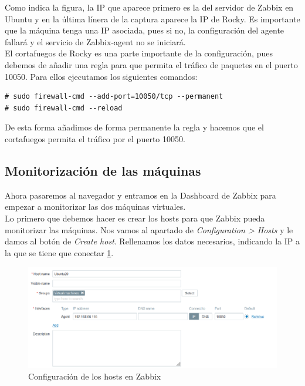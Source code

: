 Como indica la figura, la IP que aparece primero es la del servidor de Zabbix en Ubuntu y en la última línera de la captura aparece la IP de Rocky. Es importante que la máquina tenga una IP asociada, pues si no, la configuración del agente fallará y el servicio de Zabbix-agent no se iniciará.\\

El cortafuegos de Rocky es una parte importante de la configuración, pues debemos de añadir una regla para que permita el tráfico de paquetes en el puerto 10050. Para ellos ejecutamos los siguientes comandos:

\begin{lstlisting}
# sudo firewall-cmd --add-port=10050/tcp --permanent
# sudo firewall-cmd --reload
\end{lstlisting}

De esta forma añadimos de forma permanente la regla y hacemos que el cortafuegos permita el tráfico por el puerto 10050. 

\newpage
\subsection{Monitorización de las máquinas}

Ahora pasaremos al navegador y entramos en la Dashboard de Zabbix para empezar a monitorizar las dos máquinas virtuales.\\

Lo primero que debemos hacer es crear los hosts para que Zabbix pueda monitorizar las máquinas. Nos vamos al apartado de \textit{Configuration > Hosts} y le damos al botón de \textit{Create host}. Rellenamos los datos necesarios, indicando la IP a la que se tiene que conectar \ref{fig:host-config}.

\begin{figure}[H]
  \centering
  \includegraphics[scale=0.7]{Captura14}
  \caption{Configuración de los hosts en Zabbix}
  \label{fig:host-config}
\end{figure}

